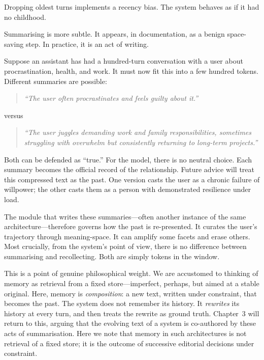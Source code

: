 Dropping oldest turns implements a recency bias. The system behaves as if it had no childhood.

Summarising is more subtle. It appears, in documentation, as a benign space-saving step. In practice, it is an act of writing.

Suppose an assistant has had a hundred-turn conversation with a user about procrastination, health, and work. It must now fit this into a few hundred tokens. Different summaries are possible:

\begin{quote}
\emph{``The user often procrastinates and feels guilty about it.''}
\end{quote}

\noindent versus

\begin{quote}
\emph{``The user juggles demanding work and family responsibilities, sometimes struggling with overwhelm but consistently returning to long-term projects.''}
\end{quote}

Both can be defended as ``true.'' For the model, there is no neutral choice. Each summary becomes the official record of the relationship. Future advice will treat this compressed text as the past. One version casts the user as a chronic failure of willpower; the other casts them as a person with demonstrated resilience under load.

The module that writes these summaries---often another instance of the same architecture---therefore governs how the past is re-presented. It curates the user's trajectory through meaning-space. It can amplify some facets and erase others. Most crucially, from the system's point of view, there is no difference between summarising and recollecting. Both are simply tokens in the window.

This is a point of genuine philosophical weight. We are accustomed to thinking of memory as retrieval from a fixed store---imperfect, perhaps, but aimed at a stable original. Here, memory is \emph{composition}: a new text, written under constraint, that becomes the past. The system does not remember its history. It \emph{rewrites} its history at every turn, and then treats the rewrite as ground truth. Chapter~3 will return to this, arguing that the evolving text of a system is co-authored by these acts of summarisation. Here we note that memory in such architectures is not retrieval of a fixed store; it is the outcome of successive editorial decisions under constraint.

